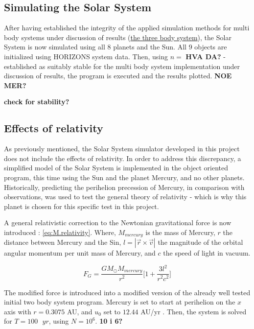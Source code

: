 \documentclass[%
oneside,                 %
final,                   %
10pt]{article}
\begin{document}
\subsection{Simulating the Solar System}
After having established the integrity of the applied simulation methods for multi body systems under discussion of results (\hyperref[subsec:Discofres:3B]{the three body system}), the Solar System is now simulated using all $8$ planets and the Sun. All $9$ objects are initialized using HORIZONS system data. Then, using $n=$ \textbf{HVA DA?} - established as suitably stable for the multi body system implementation under discussion of results, the program is executed and the results plotted. \textbf{NOE MER?}

\textbf{check for stability?}
 
\subsection{Effects of relativity}
\label{sec:M.effectsofrel}
As previously mentioned, the Solar System simulator developed in this project does not include the effects of relativity. In order to address this discrepancy, a simplified model of the Solar System is implemented in the object oriented program, this time using the Sun and the planet Mercury, and no other planets. Historically, predicting the perihelion precession of Mercury, in comparison with observations, was used to test the general theory of relativity - which is why this planet is chosen for this specific test in this project. \newline

A general relativistic correction to the Newtonian gravitational force is now introduced \cite{HJ-expaper}: \eqref{eq:M.relativity}. Where, $M_{mercury}$ is the mass of Mercury, $r$ the distance between Mercury and the Sin, $l=|\vec{r}\times \vec{v}|$ the magnitude of the orbital angular momentum per unit mass of Mercury, and $c$ the speed of light in vacuum. 

\begin{equation}
F_G=\frac{GM_{\odot}M_{mercury}}{r^2}\Big[1+\frac{3l^2}{r^2c^2}\Big]
\label{eq:M.relativity}
\end{equation}

The modified force is introduced into a modified version of the already well tested initial two body system program. Mercury is set to start at perihelion on the $x$ axis with $r=0.3075$ AU, and $u_0$ set to $12.44$ AU/yr \cite{HJ-expaper}. Then, the system is solved for $T=100 \text{ }yr$, using $N=10^6$. \textbf{10 i 6?} \newline
\end{document}
